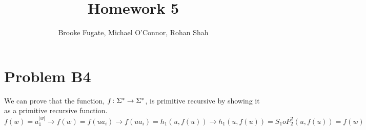 \documentclass[12pt]{article}
\begin{document}
\pagestyle{plain}
\titleformat{\subsection}[runin]
  {\normalfont\large\bfseries}{\thesubsection}{1em}{}
\titleformat{\subsubsection}[runin]
  {\bfseries}{}{1em}{}

\title{Homework 5}
\author{Brooke Fugate, Michael O'Connor, Rohan Shah}
\date{}

\maketitle

\section*{Problem B4}
We can prove that the function, $f\colon \Sigma^*\rightarrow \Sigma^*$, is primitive recursive by showing it as a primitive recursive function. \newline
$$f(w) = a_1^{|w|} \rightarrow f(w) = f(ua_i) \rightarrow f(ua_i) = h_1(u, f(u)) \rightarrow h_1(u, f(u))= S_1 o P^2_2(u, f(u)) = f(w)$$
\end{document}
